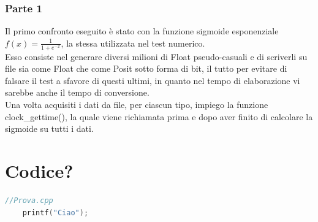 \documentclass[a4paper,11pt]{article}
\begin{document}
\subsubsection{Parte 1}

Il primo confronto eseguito è stato con la funzione sigmoide esponenziale  $ f(x) = \frac {1}{1 + e^{-x}} $, la stessa utilizzata nel test numerico.\\
Esso consiste nel generare diversi milioni di Float pseudo-casuali e di scriverli su file sia come Float che come Posit sotto forma di bit, il tutto per evitare di falsare il test a sfavore di questi ultimi, in quanto nel tempo di elaborazione vi sarebbe anche il tempo di conversione. \\
Una volta acquisiti i dati da file, per ciascun tipo, impiego la funzione clock\_gettime(), la quale viene richiamata prima e dopo aver finito di calcolare la sigmoide su tutti i dati.






\section{Codice?}

\begin{lstlisting}[language=C++]
	//Prova.cpp
	printf("Ciao");
	
	
\end{lstlisting}
\newpage




	\nocite{articolo1}
	
	\printbibliography[title=Bibliografia]

	
\end{document}
